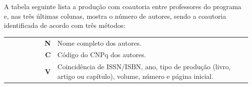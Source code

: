 \documentclass[12pt,brazil]{article}\usepackage[]{graphicx}\usepackage[]{xcolor}
\newcounter{tabela}
\begin{document}
A tabela seguinte lista a produção com coautoria entre professores do
programa e, nas três últimas colunas, mostra o número de autores, sendo a
coautoria identificada de acordo com três métodos:

\vspace{2mm}

\begin{tabular}{crl}
 ~~~~~~~~~ &  \textbf{N} & Nome completo dos autores.\\
 ~~~~~~~~~ &  \textbf{C} & Código do CNPq dos autores.\\
 ~~~~~~~~~ &  \textbf{V} & Coincidência de ISSN/ISBN, ano, tipo de produção (livro, artigo ou capítulo), volume, número e página inicial. \\
\end{tabular}

\end{document}
